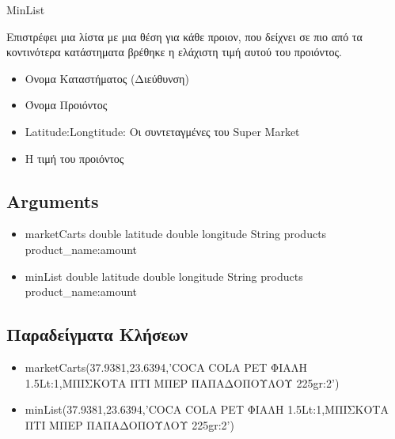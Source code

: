 \documentclass[a4paper,10pt]{report}
\begin{document}
MinList

Επιστρέφει μια λίστα με μια θέση για κάθε προιον, που δείχνει σε πιο από τα κοντινότερα κατάστηματα βρέθηκε η ελάχιστη τιμή αυτού του προιόντος.

\begin{itemize}
 \item Ονομα Καταστήματος (Διεύθυνση)
 \item Όνομα Προιόντος
 \item Latitude:Longtitude: Οι συντεταγμένες του Super Market
 \item Η τιμή του προιόντος
\end{itemize}

\subsection{Arguments}
\begin{itemize}
 \item marketCarts
 \subitem double latitude
 \subitem double longitude
 \subitem String products
 \subsubitem product\_name:amount
 \item minList
 \subitem double latitude
 \subitem double longitude
 \subitem String products
 \subsubitem product\_name:amount
\end{itemize}
\subsection{Παραδείγματα Κλήσεων}
\begin{itemize}
 \item marketCarts(37.9381,23.6394,'COCA COLA  PET ΦΙΑΛΗ 1.5Lt:1,ΜΠΙΣΚΟΤΑ ΠΤΙ ΜΠΕΡ ΠΑΠΑΔΟΠΟΥΛΟΥ 225gr:2')
 \item minList(37.9381,23.6394,'COCA COLA  PET ΦΙΑΛΗ 1.5Lt:1,ΜΠΙΣΚΟΤΑ ΠΤΙ ΜΠΕΡ ΠΑΠΑΔΟΠΟΥΛΟΥ 225gr:2')
\end{itemize}
\end{document}
